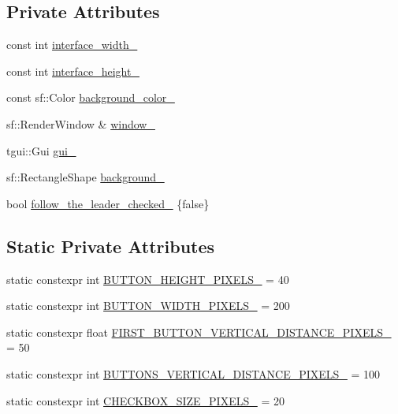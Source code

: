 \subsection*{Private Attributes}
\begin{DoxyCompactItemize}
\item 
const int \hyperlink{classGraphicalUserInterface_ae3c07ea59e557909f92882028fafb0a3}{interface\+\_\+width\+\_\+}
\item 
const int \hyperlink{classGraphicalUserInterface_a2e867c6d5b0d903d9e16e9934af93fc1}{interface\+\_\+height\+\_\+}
\item 
const sf\+::\+Color \hyperlink{classGraphicalUserInterface_a0361d82710bb150c272a2a760164241f}{background\+\_\+color\+\_\+}
\item 
sf\+::\+Render\+Window \& \hyperlink{classGraphicalUserInterface_ae51adeb759a97196eda3b37bfc80a452}{window\+\_\+}
\item 
tgui\+::\+Gui \hyperlink{classGraphicalUserInterface_ab07abda0fdb8e2965b70d2024fa3cf20}{gui\+\_\+}
\item 
sf\+::\+Rectangle\+Shape \hyperlink{classGraphicalUserInterface_a6d706ef82ec59d143a009331b40681bb}{background\+\_\+}
\item 
bool \hyperlink{classGraphicalUserInterface_a57fe5ef98f53a222aab96d191e869ad3}{follow\+\_\+the\+\_\+leader\+\_\+checked\+\_\+} \{false\}
\end{DoxyCompactItemize}
\subsection*{Static Private Attributes}
\begin{DoxyCompactItemize}
\item 
static constexpr int \hyperlink{classGraphicalUserInterface_a16c6d010f7594c76c3d4b50f7cb4764b}{B\+U\+T\+T\+O\+N\+\_\+\+H\+E\+I\+G\+H\+T\+\_\+\+P\+I\+X\+E\+L\+S\+\_\+} = 40
\item 
static constexpr int \hyperlink{classGraphicalUserInterface_a90c125308f85a684fa6e609d474f4550}{B\+U\+T\+T\+O\+N\+\_\+\+W\+I\+D\+T\+H\+\_\+\+P\+I\+X\+E\+L\+S\+\_\+} = 200
\item 
static constexpr float \hyperlink{classGraphicalUserInterface_a6448ea8aab0807628a01487db52f76c2}{F\+I\+R\+S\+T\+\_\+\+B\+U\+T\+T\+O\+N\+\_\+\+V\+E\+R\+T\+I\+C\+A\+L\+\_\+\+D\+I\+S\+T\+A\+N\+C\+E\+\_\+\+P\+I\+X\+E\+L\+S\+\_\+} = 50
\item 
static constexpr int \hyperlink{classGraphicalUserInterface_aa5dd4f194d311d5b2dd3690ed0bad8ec}{B\+U\+T\+T\+O\+N\+S\+\_\+\+V\+E\+R\+T\+I\+C\+A\+L\+\_\+\+D\+I\+S\+T\+A\+N\+C\+E\+\_\+\+P\+I\+X\+E\+L\+S\+\_\+} = 100
\item 
static constexpr int \hyperlink{classGraphicalUserInterface_afe4127bf0dbfbba90ec15fea6e046379}{C\+H\+E\+C\+K\+B\+O\+X\+\_\+\+S\+I\+Z\+E\+\_\+\+P\+I\+X\+E\+L\+S\+\_\+} = 20
\end{DoxyCompactItemize}


